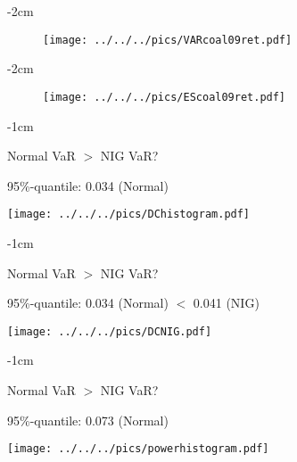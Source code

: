 


{-2cm}
\begin{figure}
\begin{center}
\texttt{[image: ../../../pics/VARcoal09ret.pdf]}
\end{center}
\end{figure}

{-2cm}
\begin{figure}
\begin{center}
\texttt{[image: ../../../pics/EScoal09ret.pdf]}
\end{center}
\end{figure}

{-1cm}
\begin{center}
Normal VaR $>$ NIG VaR?
\end{center}
95\%-quantile: \hspace{2cm} 0.034 (Normal) \hspace{1cm}\\
\begin{center}
\texttt{[image: ../../../pics/DChistogram.pdf]}
\end{center}

{-1cm}
\begin{center}
Normal VaR $>$ NIG VaR?
\end{center}
95\%-quantile: \hspace{1cm} 0.034 (Normal)  \hspace{1cm}$<$ \hspace{1cm} 0.041 (NIG)\\
\begin{center}
\texttt{[image: ../../../pics/DCNIG.pdf]}
\end{center}

{-1cm}
\begin{center}
Normal VaR $>$ NIG VaR?
\end{center}
95\%-quantile: \hspace{1cm} 0.073 (Normal) \hspace{1cm} \\
\begin{center}
\texttt{[image: ../../../pics/powerhistogram.pdf]}
\end{center}

